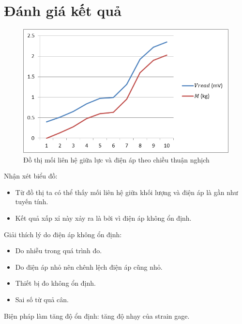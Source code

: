 \section{Đánh giá kết quả}

\begin{figure}[h]
	\centering
	\includegraphics[width=0.75\linewidth]{images/screenshot002}
	\caption{Đồ thị mối liên hệ giữa lực và điện áp theo chiều thuận nghịch}
\end{figure}

Nhận xét biểu đồ:
\begin{itemize}
	\item Từ đồ thị ta có thể thấy mối liên hệ giữa khối lượng và điện áp là gần như tuyến tính.
	\item Kết quả xấp xỉ này xảy ra là bởi vì điện áp không ổn định.
\end{itemize}

Giải thích lý do điện áp không ổn định:
\begin{itemize}
	\item Do nhiễu trong quá trình đo.
	\item Do điện áp nhỏ nên chênh lệch điện áp cũng nhỏ.
	\item Thiết bị đo không ổn định.
	\item Sai số từ quả cân.
\end{itemize}
Biện pháp làm tăng độ ổn định: tăng độ nhạy của strain gage.

